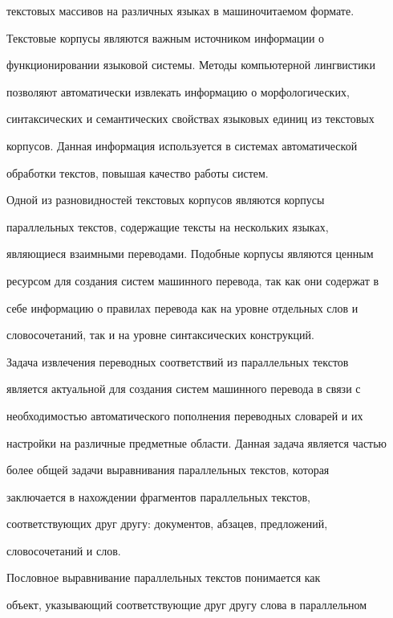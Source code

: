 текстовых массивов на различных языках в машиночитаемом формате.


Текстовые корпусы являются важным источником информации о


функционировании языковой системы. Методы компьютерной лингвистики


позволяют автоматически извлекать информацию о морфологических,


синтаксических и семантических свойствах языковых единиц из текстовых


корпусов. Данная информация используется в системах автоматической


обработки текстов, повышая качество работы систем.





     Одной из разновидностей текстовых корпусов являются корпусы


параллельных текстов, содержащие тексты на нескольких языках,


являющиеся взаимными переводами. Подобные корпусы являются ценным


ресурсом для создания сис\-тем машинного перевода, так как они содержат в


себе информацию о правилах перевода как на уровне отдельных слов и


словосочетаний, так и на уровне синтаксических конструкций.





     Задача извлечения переводных соответствий из параллельных текстов


является актуальной для создания систем машинного перевода в связи с


необходимостью автоматического пополнения переводных словарей и их


настройки на различные предметные области. Данная задача является частью


более общей задачи выравнивания параллельных текстов, которая


заключается в нахождении фрагментов параллельных текстов,


соответствующих друг другу: документов, абзацев, предложений,


словосочетаний и слов.





     Пословное выравнивание параллельных текстов понимается как


объект, указывающий соответствующие друг другу слова в параллельном


